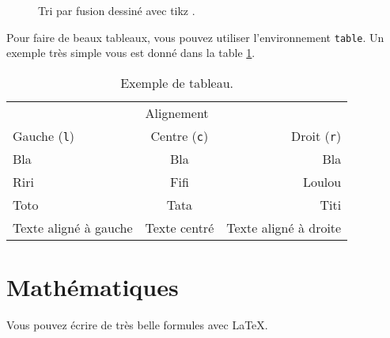 \documentclass{rapport}
\def\Latex{\LaTeX\xspace}
\begin{document}
\begin{figure}
        \caption{Tri par fusion dessiné avec tikz \textcolor{magenta}{}.\label{fig:sort}}
      \end{figure}
        
      Pour faire de beaux tableaux, vous pouvez utiliser l'environnement \verb|table|. Un exemple très simple vous est donné dans la table \ref{tab:ex}.
      
      \begin{table}
        \centering
        \begin{tabular}{l c r}
          \hline
          \multicolumn{3}{c}{Alignement}\\
          Gauche (\verb|l|) & Centre (\verb|c|) & Droit (\verb|r|)\\\hline
          Bla & Bla & Bla\\
          Riri & Fifi & Loulou\\
          Toto & Tata & Titi\\
          Texte aligné à gauche & Texte centré & Texte aligné à droite\\\hline
        \end{tabular}
        \caption{Exemple de tableau.\label{tab:ex}}
      \end{table}
      
    \section{Mathématiques}
        
      Vous pouvez écrire de très belle formules avec \Latex.
      
\end{document}
